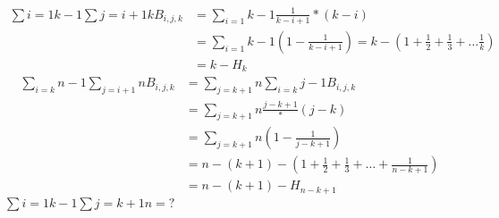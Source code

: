 \documentclass[UTF8, a4paper, linespread=1.5]{article}
\begin{document}
\begin{align*}
    \sum{i=1}{k-1}\sum{j=i+1}{k} B_{i,j,k}&=\sum_{i=1}{k-1}\frac{1}{k-i+1}*(k-i)\\
    &=\sum_{i=1}{k-1}(1-\frac{1}{k-i+1})=k-(1+\frac{1}{2}+\frac{1}{3}+\dots\frac{1}{k})\\
    &= k - H_k
\end{align*}
\begin{align*}
    \sum_{i=k}{n-1}\sum_{j=i+1}{n} B_{i,j,k}&=\sum_{j=k+1}{n}\sum_{i=k}{j-1} B_{i,j,k}\\
    &=\sum_{j=k+1}{n}\frac{j-k+1}*(j-k)\\
    &=\sum_{j=k+1}{n}(1-\frac{1}{j-k+1})\\
    &=n-(k+1)-(1+\frac{1}{2}+\frac{1}{3}+\dots+\frac{1}{n-k+1})\\
    &=n-(k+1)-H_{n-k+1}
\end{align*}
$\sum{i=1}{k-1}\sum{j=k+1}{n}=?$
\end{document}
